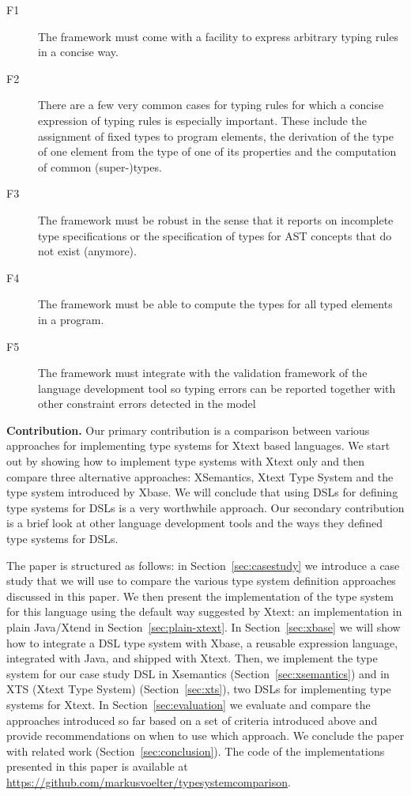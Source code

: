 \begin{description}
  \item[F1] The framework must come with a facility to express arbitrary typing
  rules in a concise way. 
  \item[F2] There are a few very common cases for typing rules for which a
  concise expression of typing rules is especially important. These include the 
  assignment of fixed types to program elements, the derivation of the type of one 
  element from the type of one of its properties and the computation of common (super-)types.
  \item[F3] The framework must be robust in the sense that it reports on
  incomplete type specifications or the specification of types for AST concepts
  that do not exist (anymore).
  \item[F4] The framework must be able to compute the types for all typed
  elements in a program. 
  \item[F5]  The framework must integrate with the validation framework of the
  language development tool so typing errors can be reported together with other
  constraint errors detected in the model
\end{description}


\textbf{Contribution.} Our primary contribution is a comparison between various
approaches for implementing type systems for Xtext based languages. We start out
by showing how to implement type systems with Xtext only and then compare three
alternative approaches: XSemantics, Xtext Type System and the type system introduced 
by Xbase. We will conclude that using DSLs for defining type systems for DSLs is
a very worthwhile approach. Our secondary contribution is a brief look
at other language development tools and the ways they defined type systems for
DSLs.

The paper is structured as follows: in Section~\ref{sec:casestudy} we
introduce a case study that we will use to compare the various type system definition approaches discussed in this paper.
We then
present the implementation of the type system for this language using the
default way suggested by Xtext: an implementation in plain Java/Xtend 
in Section~\ref{sec:plain-xtext}. In Section~\ref{sec:xbase} we will show how to
integrate a DSL type system with Xbase, a reusable expression language, integrated
with Java, and shipped with Xtext. Then, we implement
the type system for our case study DSL in Xsemantics (Section~\ref{sec:xsemantics}) and 
in XTS (Xtext Type System) (Section~\ref{sec:xts}), two DSLs for implementing
type systems for Xtext. In Section~\ref{sec:evaluation} we evaluate and compare
the approaches introduced so far based on a set of criteria introduced above and
provide recommendations on when to use which approach.  We conclude the paper
with related work (Section~\ref{sec:conclusion}).
The
code of the implementations presented in this paper is available at \\
\url{https://github.com/markusvoelter/typesystemcomparison}.

